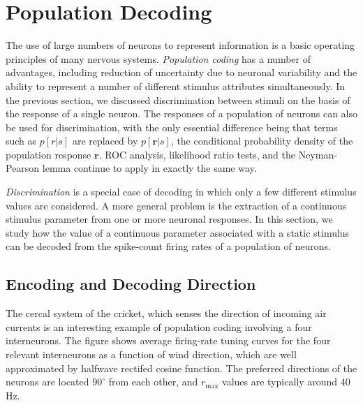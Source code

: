 \section{Population Decoding}
\label{sec:Population Decoding}

\begin{rem}
  The use of large numbers of neurons to represent information is a basic
operating principles of many nervous systems. \emph{Population coding} has a
number of advantages, including reduction of uncertainty due to neuronal
variability and the ability to represent a number of different
stimulus attributes simultaneously. In the previous section, we
discussed discrimination between stimuli on the basis of the response of
a single neuron. The responses of a population of neurons can also be
used for discrimination, with the only essential difference being that terms
such as $p[r|s]$ are replaced by $p[\mathbf{r}|s]$, the conditional
probability density of the population response $\mathbf{r}$. ROC
analysis, likelihood ratio tests, and the Neyman-Pearson lemma continue to apply in exactly the same way.
\end{rem}

\begin{rem}
  \emph{Discrimination} is a special case of decoding in which only a
  few different stimulus values are considered. A more general problem
  is the extraction of a continuous stimulus parameter from one or
  more neuronal responses. In this section, we study how the value of a continuous parameter associated with a static stimulus can be decoded from the spike-count firing
rates of a population of neurons.
\end{rem}

\subsection{Encoding and Decoding Direction}
\begin{exm}
  The cercal system of the cricket, which senses the direction of incoming air
currents is an interesting example of population coding involving a
four interneurons. The figure shows average firing-rate tuning curves
for the four relevant interneurons as a function of wind
direction, which are well approximated by halfwave rectifed cosine
function. The preferred directions of the neurons are located $90^{\circ}$ from each other, and $r_{\max}$
values are typically around 40 Hz.
\end{exm}

